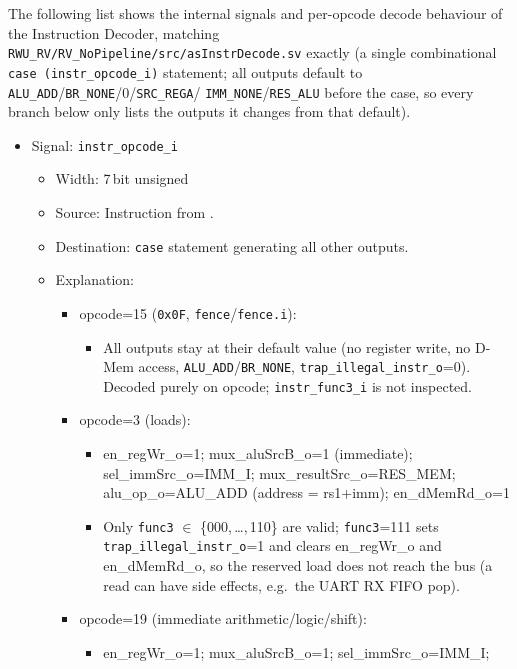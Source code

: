The following list shows the internal signals and per-opcode decode
behaviour of the Instruction Decoder, matching
\texttt{RWU\_RV/RV\_NoPipeline/src/asInstrDecode.sv} exactly (a single
combinational \texttt{case (instr\_opcode\_i)} statement; all outputs
default to \texttt{ALU\_ADD}/\texttt{BR\_NONE}/0/\texttt{SRC\_REGA}/
\texttt{IMM\_NONE}/\texttt{RES\_ALU} before the case, so every branch below
only lists the outputs it changes from that default).
\begin{itemize}
  \item Signal: \texttt{instr\_opcode\_i}
  \begin{itemize}
    \item Width: 7\,bit unsigned
    \item Source: Instruction from .
    \item Destination: \texttt{case} statement generating all other outputs.
    \item Explanation:
    \begin{itemize}
      \item opcode=15 (\texttt{0x0F}, \texttt{fence}/\texttt{fence.i}):
      \begin{itemize}
        \item All outputs stay at their default value (no register write,
          no D-Mem access, \texttt{ALU\_ADD}/\texttt{BR\_NONE},
          \texttt{trap\_illegal\_instr\_o}=0). Decoded purely on opcode;
          \texttt{instr\_func3\_i} is not inspected.
      \end{itemize}
      \item opcode=3 (loads):
      \begin{itemize}
        \item en\_regWr\_o=1; mux\_aluSrcB\_o=1 (immediate); sel\_immSrc\_o=IMM\_I;
          mux\_resultSrc\_o=RES\_MEM; alu\_op\_o=ALU\_ADD (address = rs1+imm);
          en\_dMemRd\_o=1
        \item Only \texttt{func3} $\in$ \{000,\,\ldots,\,110\} are valid;
          \texttt{func3}=111 sets \texttt{trap\_illegal\_instr\_o}=1 and
          clears en\_regWr\_o and en\_dMemRd\_o, so the reserved load does
          not reach the bus (a read can have side effects, e.g.\ the UART RX
          FIFO pop).
      \end{itemize}
      \item opcode=19 (immediate arithmetic/logic/shift):
      \begin{itemize}
        \item en\_regWr\_o=1; mux\_aluSrcB\_o=1; sel\_immSrc\_o=IMM\_I;

\end{itemize}
\end{itemize}
\end{itemize}
\end{itemize}

